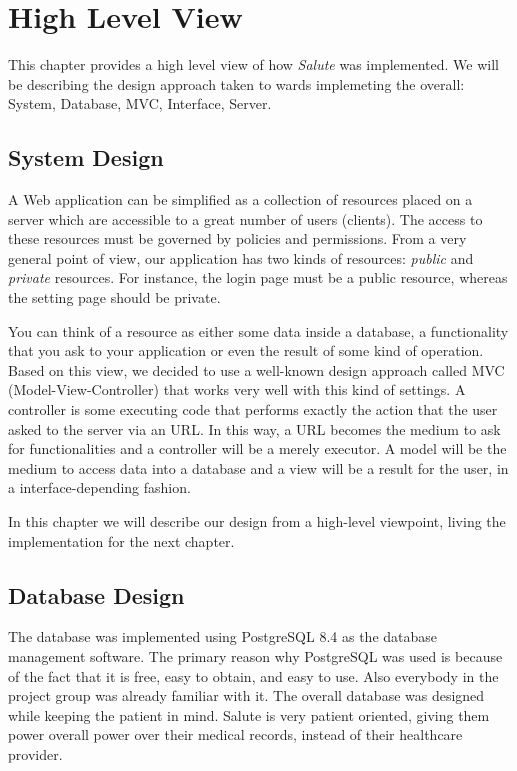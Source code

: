 \documentclass[12pt]{report}
\begin{document}
\chapter{High Level View}
This chapter provides a high level view of how \emph{Salute} was implemented.  We will be describing the design approach taken to wards implemeting the overall: System, Database, MVC, Interface, Server.

\section{System Design}
A Web application can be simplified as a collection of resources placed on a server which are accessible to a great number of users (clients). The access to these resources must be governed by policies and permissions. From a very general point of view, our application has two kinds of resources: \emph{public} and \emph{private} resources. For instance, the login page must be a public resource, whereas the setting page should be private.

You can think of a resource as either some data inside a database, a functionality that you ask to your application or even the result of some kind of operation. Based on this view, we decided to use a well-known design approach called MVC (Model-View-Controller) that works very well with this kind of settings. A controller is some executing code that performs exactly the action that the user asked to the server via an URL. In this way, a URL becomes the medium to ask for functionalities and a controller will be a merely executor. A model will be the medium to access data into a database and a view will be a result for the user, in a interface-depending fashion.

In this chapter we will describe our design from a high-level viewpoint, living the implementation for the next chapter.

\section{Database Design}
The database was implemented using PostgreSQL 8.4 as the database management software.  The primary reason why PostgreSQL was used is because of the fact that it is free, easy to obtain, and easy to use. Also everybody in the project group was already familiar with it.
The overall database was designed while keeping the patient in mind.  Salute is very patient oriented, giving them power overall  power over their medical records, instead of their healthcare provider.
\end{document}
